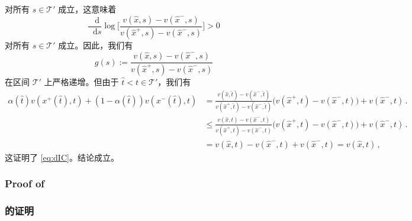 \documentclass[12pt,letterpaper]{article}
\newenvironment{original}{\color{black}\noindent}{}
\newenvironment{translation}{\color{blue}\noindent}{}
\theoremstyle{plain}
\theoremstyle{definition}
\theoremstyle{remark}
\renewcommand{\1}{\mathds{1}}
\renewcommand*\d{\mathop{}\!\mathrm{d}}
\theoremstyle{definition}
\begin{document}
\begin{translation}
对所有 $s \in \mathcal{T}'$ 成立，这意味着
\[ \frac{\d}{\d s}   \log\Bigg[\frac{v(\hat{x}, s) - v(\hat{x}^-, s)}{v(\hat{x}^+, s) - v(\hat{x}^-, s)}\Bigg]  >  0\]
对所有 $s \in \mathcal{T}'$ 成立。因此，我们有
\[g(s):= \frac{v(\hat{x}, s) - v(\hat{x}^-, s)}{v(\hat{x}^+, s) - v(\hat{x}^-, s)}\]
在区间 $\mathcal{T}'$ 上严格递增。但由于 $\hat{t} < t \in \mathcal{T}'$，我们有
\begin{align*}
\alpha(\hat{t}) v(x^{+}(\hat{t}), t) + (1 - \alpha(\hat{t})) v(x^{-}(\hat{t}), t)
 &= \frac{v(\hat{x}, \hat{t}) - v(\hat{x}^{-}, \hat{t})}{ v(\hat{x}^{+}, \hat{t}) -  v(\hat{x}^{-}, \hat{t})}\big(v(\hat{x}^+, t) - v(\hat{x}^-, t)\big) +v(\hat{x}^-, t)\,. \\
 &\leq \frac{v(\hat{x}, t) - v(\hat{x}^{-}, t)}{ v(\hat{x}^{+}, t) -  v(\hat{x}^{-}, t)}\big(v(\hat{x}^+, t) - v(\hat{x}^-, t)\big) +v(\hat{x}^-, t)\,. \\
  &= v(\hat{x}, t) - v(\hat{x}^{-}, t) +v(\hat{x}^-, t) = v(\hat{x}, t)\,,
\end{align*}
这证明了 \eqref{eq:dIC}。结论成立。
\end{translation}

\begin{original}
\subsubsection{Proof of }\label{subsec:downward}
\end{original}
\begin{translation}
\subsubsection{的证明}\label{subsec:downward}
\end{translation}
\end{document}
